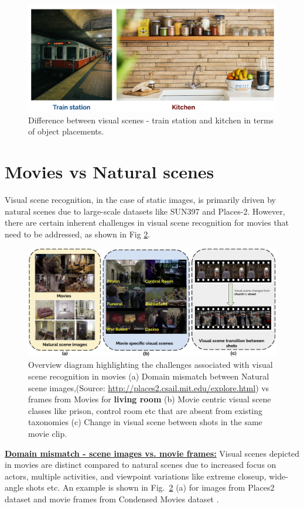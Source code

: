 \begin{figure}[h!]
    \centering 
     \includegraphics[width=0.6\linewidth]{figures/train_station_kitchen.png}
     \caption{Difference between visual scenes - train station and kitchen in terms of object placements.}
     \label{station_kitchen}
\end{figure}
\section{Movies vs Natural scenes}
Visual scene recognition, in the case of static images, is primarily driven by natural scenes due to large-scale datasets like SUN397 \cite{Xiao2010SUNDL} and Places-2\cite{zhou2017places}. However, there are certain inherent challenges in visual scene recognition for movies that need to be addressed, as shown in Fig \ref{Intro figure}.
\begin{figure}[!h]
 \centering
  \includegraphics[width=0.8\linewidth]{figures/Introduction_Figure.png}
  \caption{Overview diagram highlighting the challenges associated with visual scene recognition in movies (a) Domain mismatch between Natural scene images,(Source: \url{http://places2.csail.mit.edu/explore.html}) vs frames from Movies for \textbf{living room} (b) Movie centric visual scene classes like prison, control room etc that are absent from existing taxonomies (c) Change in visual scene between shots in the same movie clip.}
  \label{Intro figure}
\end{figure}
\textbf{\underline{Domain mismatch - scene images vs. movie frames:}} Visual scenes depicted in movies are distinct compared to natural scenes due to increased focus on actors, multiple activities, and viewpoint variations like extreme closeup, wide-angle shots etc. An example is shown in Fig.~\ref{Intro figure} (a) for images from Places2 dataset \cite{zhou2017places} and movie frames from Condensed Movies dataset \cite{bain2020condensed}.\\

